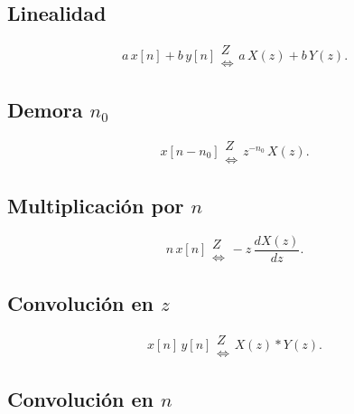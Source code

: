 \subsection{Linealidad}

\begin{equation}
a \, x\left[ n\right] +b \, y\left[ n\right] 
\begin{array}{c}
Z \\ 
\Leftrightarrow
\end{array}
a \, X\left( z\right) +b \, Y\left( z\right) .
\end{equation}

\subsection{Demora $n_{0}$}

\begin{equation}
x\left[ n-n_{0}\right] 
\begin{array}{c}
Z \\ 
\Leftrightarrow
\end{array}
z^{-n_{0}} \, X\left( z\right) .
\end{equation}

\subsection{Multiplicaci\'{o}n por $n$}

\begin{equation}
n \, x\left[ n\right] 
\begin{array}{c}
Z \\ 
\Leftrightarrow
\end{array}
-z \, \frac{dX\left( z\right) }{dz}.
\end{equation}

\subsection{Convoluci\'{o}n en $z$}

\begin{equation}
x\left[ n\right] \,  y\left[ n\right] 
\begin{array}{c}
Z \\ 
\Leftrightarrow
\end{array}
X\left( z\right) * Y\left( z\right) .
\end{equation}

\subsection{Convoluci\'{o}n en $n$}

